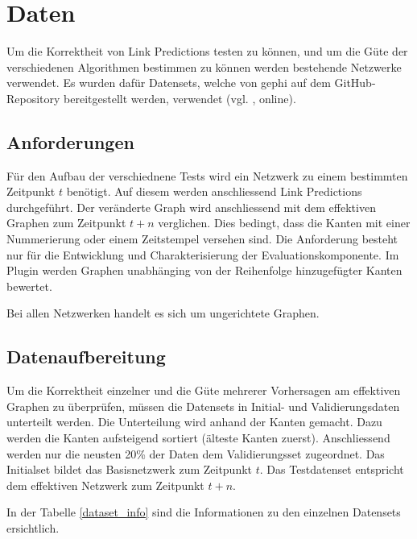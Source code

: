 \chapter{Daten}
\label{daten}
Um die Korrektheit von Link Predictions testen zu können, und um die Güte der verschiedenen Algorithmen bestimmen zu können werden bestehende Netzwerke verwendet.
Es wurden dafür Datensets, welche von \acs{gephi} auf dem GitHub-Repository bereitgestellt werden, verwendet (vgl. \cite{moll_datasets_2018}, online).

\section{Anforderungen}
Für den Aufbau der verschiednene Tests wird ein Netzwerk zu einem bestimmten Zeitpunkt $t$ benötigt.
Auf diesem werden anschliessend Link Predictions durchgeführt.
Der veränderte Graph wird anschliessend mit dem effektiven Graphen zum Zeitpunkt $t + n$ verglichen.
Dies bedingt, dass die Kanten mit einer Nummerierung oder einem Zeitstempel versehen sind.
Die Anforderung besteht nur für die Entwicklung und Charakterisierung der Evaluationskomponente.
Im Plugin werden Graphen unabhänging von der Reihenfolge hinzugefügter Kanten bewertet.

Bei allen Netzwerken handelt es sich um ungerichtete Graphen.

\section{Datenaufbereitung}
Um die Korrektheit einzelner und die Güte mehrerer Vorhersagen am effektiven Graphen zu überprüfen, müssen die Datensets in Initial- und Validierungsdaten unterteilt werden.
Die Unterteilung wird anhand der Kanten gemacht. Dazu werden die Kanten aufsteigend sortiert (älteste Kanten zuerst).
Anschliessend werden nur die neusten 20\% der Daten dem Validierungsset zugeordnet. Das Initialset bildet das Basisnetzwerk zum Zeitpunkt $t$.
Das Testdatenset entspricht dem effektiven Netzwerk zum Zeitpunkt $t + n$.

In der Tabelle \ref{dataset_info} sind die Informationen zu den einzelnen Datensets ersichtlich.

